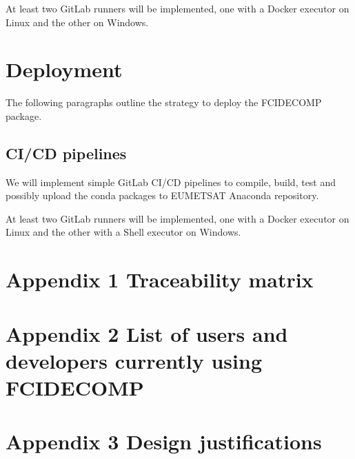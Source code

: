 \documentclass[a4paper,10pt,english]{sphinxmanual}
\begin{document}
\sphinxAtStartPar
At least two GitLab runners will be implemented, one with a Docker executor on Linux and the other on Windows.


\chapter{Deployment}
\label{\detokenize{deployment:deployment}}\label{\detokenize{deployment::doc}}
\sphinxAtStartPar
The following paragraphs outline the strategy to deploy the FCIDECOMP package.


\section{CI/CD pipelines}
\label{\detokenize{deployment:ci-cd-pipelines}}
\sphinxAtStartPar
We will implement simple GitLab CI/CD pipelines to compile, build, test and possibly upload the conda packages to
EUMETSAT Anaconda repository.

\sphinxAtStartPar
At least two GitLab runners will be implemented, one with a Docker executor on Linux and the other with a Shell
executor on Windows.


\chapter{Appendix 1 \sphinxhyphen{} Traceability matrix}
\label{\detokenize{app_traceability_matrix:appendix-1-traceability-matrix}}\label{\detokenize{app_traceability_matrix::doc}}

\chapter{Appendix 2 \sphinxhyphen{} List of users and developers currently using FCIDECOMP}
\label{\detokenize{app_users_using_FCIDECOMP:appendix-2-list-of-users-and-developers-currently-using-fcidecomp}}\label{\detokenize{app_users_using_FCIDECOMP::doc}}

\chapter{Appendix 3 \sphinxhyphen{} Design justifications}
\label{\detokenize{app_design_justifications:appendix-3-design-justifications}}\label{\detokenize{app_design_justifications::doc}}


\renewcommand{\indexname}{Index}
\printindex
\end{document}
